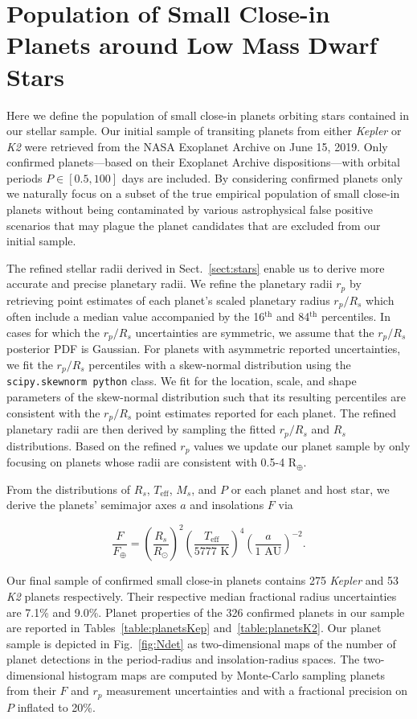 \documentclass[twocolumn]{emulateapj}
\newcommand{\kepler}[1]{\emph{Kepler}#1}
\newcommand{\ktwo}[1]{\emph{K2}#1}
\newcommand{\teff}[1]{$T_{\text{eff}}$#1}
\begin{document}
\section{Population of Small Close-in Planets around Low Mass Dwarf Stars} \label{sect:planets}
Here we define the population of small close-in planets orbiting stars contained in our stellar sample.
Our initial sample of transiting planets from either \kepler{} or \ktwo{} were retrieved from the
NASA Exoplanet Archive \citep{akeson13} on June 15, 2019. Only confirmed
planets---based on their Exoplanet Archive dispositions---with orbital periods
$P\in [0.5,100]$ days are included. By considering confirmed
planets only we naturally focus on a subset of the true empirical population of small close-in planets
without being contaminated by various astrophysical false positive scenarios that may plague the planet
candidates that are excluded from our initial sample.

The refined stellar radii derived in Sect.~\ref{sect:stars} enable us to derive more accurate and precise
planetary radii.
We refine the planetary radii $r_p$ by retrieving point estimates of each planet's scaled planetary radius
$r_p/R_s$ which often include a median value 
accompanied by the 16$^{\text{th}}$ and 84$^{\text{th}}$ percentiles. In cases for which the $r_p/R_s$ uncertainties
are symmetric, we assume that the $r_p/R_s$ posterior PDF is Gaussian. For planets with asymmetric reported
uncertainties, we fit the $r_p/R_s$ percentiles with a skew-normal distribution using the
\texttt{scipy.skewnorm python} class. We fit for the location, scale, and shape parameters of the
skew-normal distribution such that its resulting percentiles are consistent with
the $r_p/R_s$ point estimates reported for each planet. The refined planetary radii are then derived by sampling the
fitted $r_p/R_s$ and $R_s$ distributions. Based on the refined $r_p$ values we update our planet sample by
only focusing on planets whose radii are consistent with 0.5-4 R$_{\oplus}$.

From the distributions of $R_s$, \teff{,} $M_s$, and $P$ or each planet and host star, we derive the planets'
semimajor axes $a$ and insolations $F$ via

\begin{equation}
  \frac{F}{F_{\oplus}} = \left( \frac{R_s}{R_{\odot}} \right)^2  \left( \frac{T_{\text{eff}}}{5777 \text{ K}} \right)^4 \left( \frac{a}{1 \text{ AU}} \right)^{-2}.
\end{equation}

Our final sample of confirmed small close-in planets 
contains 275 \kepler{} and 53 \ktwo{} planets respectively. Their respective median fractional
radius uncertainties are 7.1\% and 9.0\%. Planet properties of the 326 confirmed planets in our sample
are reported in Tables~\ref{table:planetsKep} and~\ref{table:planetsK2}. Our planet sample is
depicted in Fig.~\ref{fig:Ndet} as two-dimensional maps of the number of planet detections in
the period-radius and insolation-radius spaces. The two-dimensional histogram maps are computed by
Monte-Carlo sampling planets from their $F$ and $r_p$
measurement uncertainties and with a fractional precision on $P$ inflated to 20\%.
\end{document}
